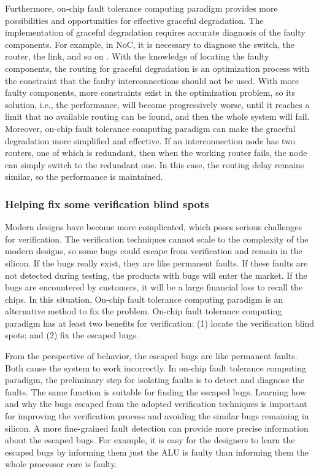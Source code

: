 Furthermore, on-chip fault tolerance computing paradigm provides more possibilities and opportunities for effective graceful degradation. The implementation of graceful degradation requires accurate diagnosis of the faulty components. For example, in NoC, it is necessary to diagnose the switch, the router, the link, and so on \cite{kohler2010fault}. With the knowledge of locating the faulty components, the routing for graceful degradation is an optimization process with the constraint that the faulty interconnections should not be used. With more faulty components, more constraints exist in the optimization problem, so its solution, i.e., the performance, will become progressively worse, until it reaches a limit that no available routing can be found, and then the whole system will fail. 
Moreover, on-chip fault tolerance computing paradigm can make the graceful degradation more simplified and effective. If an interconnection node has two routers, one of which is redundant, then when the working router fails, the node can simply switch to the redundant one. In this case, the routing delay remains similar, so the performance is maintained.

\subsubsection{Helping fix some verification blind spots}
Modern designs have become more complicated, which poses serious challenges for verification. The verification techniques cannot scale to the complexity of the modern designs, so some bugs could escape from verification and remain in the silicon. If the bugs really exist, they are like permanent faults. If these faults are not detected during testing, the products with bugs will enter the market. If the bugs are encountered by customers, it will be a large financial loss to recall the chips. In this situation, On-chip fault tolerance computing paradigm is an alternative method to fix the problem. On-chip fault tolerance computing paradigm has at least two benefits for verification: (1) locate the verification blind spots; and (2) fix the escaped bugs.

From the perspective of behavior, the escaped bugs are like permanent faults. Both cause the system to work incorrectly. In on-chip fault tolerance computing paradigm, the preliminary step for isolating faults is to detect and diagnose the faults. The same function is suitable for finding the escaped bugs. Learning how and why the bugs escaped from the adopted verification techniques is important for improving the verification process and avoiding the similar bugs remaining in silicon. A more fine-grained fault detection can provide more precise information about the escaped bugs. For example, it is easy for the designers to learn the escaped bugs by informing them just the ALU is faulty than informing them the whole processor core is faulty.

